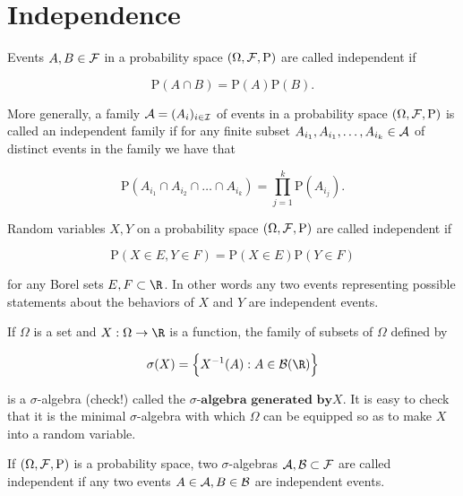 \section{Independence}

\begin{defn}
Events $A, B \in {\cal F}$ in a probability space
$(\Omega, {\cal F}, \mathrm{P})$ are called
independent if

\[
\mathrm{P}(A\cap B) = \mathrm{P}(A)\mathrm{P}(B).
\]

\noindent More generally, a family
${\cal A}=(A_i)_{i\in {\cal I}}$ of events in a
probability space $(\Omega, {\cal F}, \mathrm{P})$ is
called an independent family if for any finite subset
$A_{i_1}, A_{i_1}, \ldots, A_{i_k} \in {\cal A}$ of
distinct events in the family we have that

\[
\mathrm{P}(A_{i_1} \cap A_{i_2} \cap \ldots \cap A_{i_k}) = \prod_{j=1}^k \mathrm{P}(A_{i_j}).
\]

\end{defn}

\begin{defn}
Random variables $X, Y$ on a probability space
$(\Omega, {\cal F}, \mathrm{P})$ are called
independent if

\[
\mathrm{P}(X \in E, Y \in F) = \mathrm{P}(X\in E)\mathrm{P}(Y\in F)
\]

\noindent for any Borel sets $E,F \subset \R$. In other words
any two events representing possible statements about
the behaviors of $X$ and $Y$ are independent events.
\end{defn}

\begin{defn}
If $\Omega$ is a set and $X:\Omega\to\R$ is a
function, the family of subsets of $\Omega$ defined
by

\[
\sigma(X) = \Big\{ X^{-1}(A) : A \in {\cal B}(\R) \Big\}
\]

\noindent is a $\sigma$-algebra (check!) called the
$\textbf{$\sigma$-algebra generated by$X$}$. It is
easy to check that it is the minimal $\sigma$-algebra
with which $\Omega$ can be equipped so as to make $X$
into a random variable.
\end{defn}

\begin{defn}
If $(\Omega, {\cal F}, \mathrm{P})$ is a probability
space, two $\sigma$-algebras
${\cal A}, {\cal B}\subset {\cal F}$ are called
independent if any two events
$A\in {\cal A}, B\in{\cal B}$ are independent events.
\end{defn}

